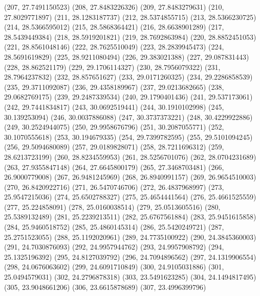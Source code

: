 {					(207, 27.7491150523)
					(208, 27.8483226326)
					(209, 27.8483279631)
					(210, 27.8029771897)
					(211, 28.1283187737)
					(212, 28.5374855715)
					(213, 28.5366230725)
					(214, 28.5366595012)
					(215, 28.5868364421)
					(216, 28.6638901289)
					(217, 28.5439449384)
					(218, 28.5919201821)
					(219, 28.7692863984)
					(220, 28.8852451053)
					(221, 28.8561048146)
					(222, 28.7625510049)
					(223, 28.2839945473)
					(224, 28.5691619829)
					(225, 28.9211080494)
					(226, 29.383021388)
					(227, 29.087831443)
					(228, 28.862521179)
					(229, 29.1706114327)
					(230, 28.7956079322)
					(231, 28.7964237832)
					(232, 28.857651627)
					(233, 29.0171260325)
					(234, 29.2286858539)
					(235, 29.3711092087)
					(236, 29.4358189967)
					(237, 29.0213682665)
					(238, 29.0682769175)
					(239, 29.2487339534)
					(240, 29.1790401436)
					(241, 29.537173061)
					(242, 29.7441834817)
					(243, 30.0692519441)
					(244, 30.1910102998)
					(245, 30.139253094)
					(246, 30.0037886088)
					(247, 30.3737373221)
					(248, 30.4229922886)
					(249, 30.2524944075)
					(250, 29.9958676796)
					(251, 30.2087055771)
					(252, 30.1070555618)
					(253, 30.194679335)
					(254, 29.7399782595)
					(255, 29.5101094245)
					(256, 29.5094680089)
					(257, 29.0189828071)
					(258, 28.7211696312)
					(259, 28.6213723199)
					(260, 28.8234559953)
					(261, 28.5256701076)
					(262, 28.0704231689)
					(263, 27.9355847148)
					(264, 27.6645800179)
					(265, 27.3468703481)
					(266, 26.9000779008)
					(267, 26.9481245969)
					(268, 26.8940991157)
					(269, 26.9654510003)
					(270, 26.8420922716)
					(271, 26.5470746706)
					(272, 26.4837968997)
					(273, 25.9547215036)
					(274, 25.6502788327)
					(275, 25.4654441564)
					(276, 25.4661525559)
					(277, 25.224858091)
					(278, 25.0160038514)
					(279, 25.0513605516)
					(280, 25.5389132489)
					(281, 25.2239213511)
					(282, 25.6767561884)
					(283, 25.9451615858)
					(284, 25.9460518752)
					(285, 25.4860145314)
					(286, 25.5420249721)
					(287, 25.2751523055)
					(288, 25.1192020961)
					(289, 24.7735100922)
					(290, 24.3845360003)
					(291, 24.7030876093)
					(292, 24.9957944762)
					(293, 24.9957908792)
					(294, 25.1325196392)
					(295, 24.8127039792)
					(296, 24.7094896562)
					(297, 24.1319906554)
					(298, 24.0676063602)
					(299, 24.6091710849)
					(300, 24.9105031886)
					(301, 25.0494579031)
					(302, 24.2796878318)
					(303, 23.5491623285)
					(304, 24.1494817495)
					(305, 23.9048661206)
					(306, 23.6615878689)
					(307, 23.4996399796)
}
